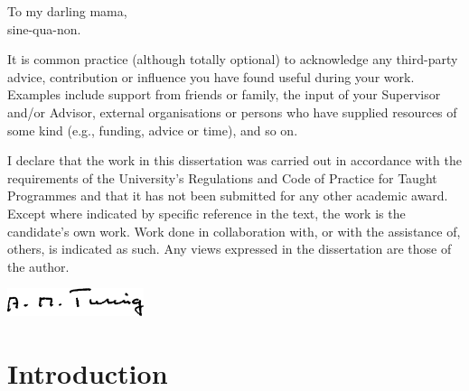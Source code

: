 \documentclass[
]{uob-thesis}
\begin{document}
\begin{dedication}  %
  To my darling mama,\\
  sine-qua-non.
\end{dedication}

\begin{acknowledgements}
It is common practice (although totally optional) to acknowledge any third-party
advice, contribution or influence you have found useful during your work.
Examples include support from friends or family, the input of your Supervisor
and/or Advisor, external organisations or persons who have supplied resources
of some kind (e.g., funding, advice or time), and so on.
\end{acknowledgements}

\begin{declaration}
  I declare that the work in this dissertation was carried out in accordance
  with the requirements of the University's Regulations and Code of Practice for
  Taught Programmes and that it has not been submitted for any other academic award.
  Except where indicated by specific reference in the text, the work is the
  candidate's own work. Work done in collaboration with, or with the assistance
  of, others, is indicated as such. Any views expressed in the
  dissertation are those of the author.
  
  \vspace{2cm}

  \includegraphics[width=4cm]{sig} %
\end{declaration}




\frontmatter

\tableofcontents
\listoftables
\listoffigures



\mainmatter

\chapter{Introduction}

  
\end{document}
